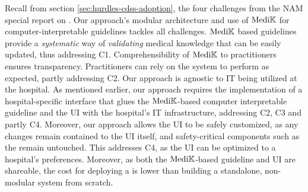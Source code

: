 Recall from section \ref{sec:hurdles-cdss-adoption}, the four challenges from
the NAM{} special report on \CDSSs{}. Our approach's modular architecture and
use of $\text{Medi}\mathbb{K}{}{}$ for computer-interpretable guidelines tackles all
challenges. $\text{Medi}\mathbb{K}{}{}$ based guidelines provide a \emph{systematic} way of
\emph{validating} medical knowledge that can be easily updated, thus addressing
C1. Comprehensibility of $\text{Medi}\mathbb{K}{}{}$ to practitioners ensures transparency.
Practitioners can rely on the system to perform as expected, partly addressing C2.
Our approach is agnostic to IT being utilized at the
hospital. As mentioned earlier, our approach requires the implementation
of a hospital-specific interface that glues the $\text{Medi}\mathbb{K}{}{}$-based
computer interpretable guideline and the UI with the hospital's IT
infrastructure, addressing C2, C3 and partly C4. Moreover,
our approach allows the UI to be safely customized,
as any changes remain contained to the UI itself, and safety-critical
components such as the \BPGLogic{} remain untouched. This addresses C4,
as the UI can be optimized to a hospital's preferences. Moreover,
as both the $\text{Medi}\mathbb{K}{}{}$-based guideline and UI are shareable, the cost
for deploying a \CDSS{} is lower than building a standalone,
non-modular system from scratch.





